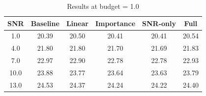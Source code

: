 \begin{table}[h]
\centering
\caption{Results at budget = 1.0}
\begin{tabular}{c|ccccc}
\hline
SNR & Baseline & Linear & Importance & SNR-only & Full \\
\hline
1.0 & 20.39 & 20.50 & 20.41 & 20.41 & 20.54 \\
4.0 & 21.80 & 21.80 & 21.70 & 21.69 & 21.83 \\
7.0 & 22.97 & 22.90 & 22.78 & 22.78 & 22.93 \\
10.0 & 23.88 & 23.77 & 23.64 & 23.63 & 23.79 \\
13.0 & 24.53 & 24.37 & 24.24 & 24.22 & 24.40 \\
\hline
\end{tabular}
\end{table}

